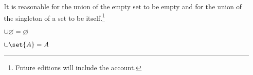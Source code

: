 It is reasonable for the union of the empty set to be empty and for the union of the singleton of a set to be itself.\footnote{Future editions will include the account.}

\begin{proposition}
$\cup \varnothing = \varnothing$
\end{proposition}

%  


\begin{proposition}
$\cup \set{A} = A$
\end{proposition}

%  

